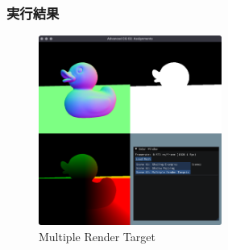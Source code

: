 \documentclass[a4paper,10pt,uplatex,dvipdfmx]{jsarticle}
\begin{document}
\subsubsection*{実行結果}
\begin{figure}[H]
  \centering
  \includegraphics*[width=6cm]{./img/mrt.png}
  \caption{Multiple Render Target}
\end{figure}
\end{document}
